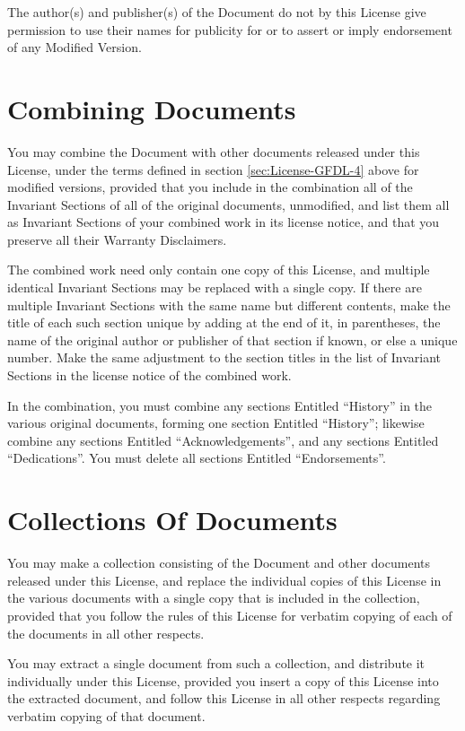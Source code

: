 The author(s) and publisher(s) of the Document do not by this License
give permission to use their names for publicity for or to assert or
imply endorsement of any Modified Version.

\section{Combining Documents}
\label{sec:License-GFDL-5}

You may combine the Document with other documents released under this
License, under the terms defined in section \ref{sec:License-GFDL-4}
above for modified versions, provided that you include in the
combination all of the Invariant Sections of all of the original
documents, unmodified, and list them all as Invariant Sections of your
combined work in its license notice, and that you preserve all their
Warranty Disclaimers.

The combined work need only contain one copy of this License, and
multiple identical Invariant Sections may be replaced with a single
copy.  If there are multiple Invariant Sections with the same name but
different contents, make the title of each such section unique by
adding at the end of it, in parentheses, the name of the original
author or publisher of that section if known, or else a unique number.
Make the same adjustment to the section titles in the list of
Invariant Sections in the license notice of the combined work.

In the combination, you must combine any sections Entitled ``History''
in the various original documents, forming one section Entitled
``History''; likewise combine any sections Entitled
``Acknowledgements'',
and any sections Entitled ``Dedications''.  You must delete all sections
Entitled ``Endorsements''.

\section{Collections Of Documents}
\label{sec:License-GFDL-6}

You may make a collection consisting of the Document and other
documents released under this License, and replace the individual
copies of this License in the various documents with a single copy
that is included in the collection, provided that you follow the rules
of this License for verbatim copying of each of the documents in all
other respects.

You may extract a single document from such a collection, and
distribute it individually under this License, provided you insert a
copy of this License into the extracted document, and follow this
License in all other respects regarding verbatim copying of that
document.

